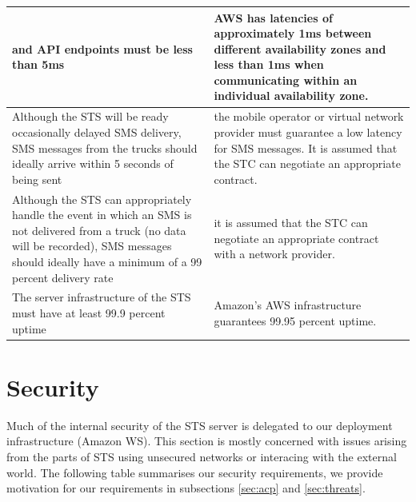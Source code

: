 \documentclass[a4paper,11pt]{report}
\begin{document}
\begin{center}
\begin{longtable}[h!]{| p{} | p{} |}
    and API endpoints must be less than 5ms & AWS has latencies of
    approximately 1ms between different availability zones and less than 1ms
    when communicating within an individual availability zone. \\
    \hline
    Although the STS will be ready occasionally delayed SMS delivery, SMS
    messages from the trucks should ideally arrive within 5 seconds of being
    sent & the mobile operator or virtual network provider must guarantee a low
    latency for SMS messages. It is assumed that the STC can negotiate an
    appropriate contract. \\
    \hline
    Although the STS can appropriately handle the event in which an SMS is
    not delivered from a truck (no data will be recorded), SMS messages should
    ideally have a minimum of a 99 percent delivery rate & it is assumed that 
    the STC can negotiate an appropriate contract with a network provider. \\
    \hline
    The server infrastructure of the STS must have at least 99.9
    percent uptime & Amazon's AWS infrastructure guarantees 99.95 percent
    uptime. \\
    \hline
 \end{longtable}
\end{center}


\section{Security}
\label{sec:security}

Much of the internal security of the STS server is delegated to our
deployment infrastructure (Amazon WS).  This section is mostly
concerned with issues arising from the parts of STS using unsecured
networks or interacing with the external world.  The following table
summarises our security requirements, we provide motivation for our
requirements in subsections \ref{sec:acp} and \ref{sec:threats}.
\end{document}
